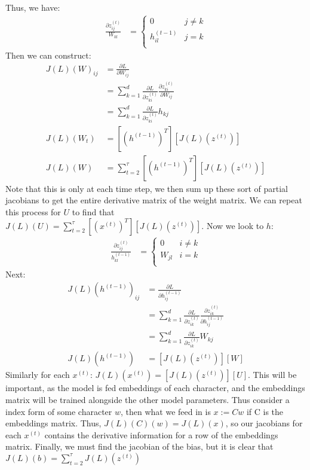 \documentclass[12pt]{article}
\begin{document}
Thus, we have:
\begin{align*}
    \frac{\partial z^{(t)}_{ij}}{W_{kl}} &= \begin{cases}
        0 & j \neq k \\
        h^{(t-1)}_{il} & j = k \\
    \end{cases}
\end{align*}
Then we can construct:
\begin{align*}
    J(L)(W)_{ij} &= \frac{\partial L}{\partial W_{ij}} \\
    &= \sum_{k = 1}^{d} \frac{\partial L}{\partial z^{(t)}_{ki}}\frac{\partial z^{(t)}_{ki}}{\partial W_{ij}} \\
    &= \sum_{k = 1}^{d} \frac{\partial L}{\partial z^{(t)}_{ki}}h_{kj} \\
    J(L)(W_t) &= [(h^{(t-1)})^T][J(L)(z^{(t)})] \\
    J(L)(W) &= \displaystyle \sum_{t = 2}^{\tau}[(h^{(t-1)})^T][J(L)(z^{(t)})]
\end{align*}
Note that this is only at each time step, we then sum up these sort of partial jacobians to get the entire derivative matrix of the weight matrix. We can repeat this process for $U$ to find that
$J(L)(U) = \displaystyle \sum_{t = 2}^{\tau}[(x^{(t)})^T][J(L)(z^{(t)})]$. Now we look to $h$:
\begin{align*}
    \frac{\partial z^{(t)}_{ij}}{h^{(t-1)}_{kl}} &= \begin{cases}
        0 & i \neq k \\
        W_{jl} & i = k \\
    \end{cases}
\end{align*}
Next:
\begin{align*}
    J(L)(h^{(t-1)})_{ij} &= \frac{\partial L}{\partial h^{(t-1)}_{ij}} \\
    &= \sum_{k = 1}^{d} \frac{\partial L}{\partial z^{(t)}_{ik}}\frac{\partial z^{(t)}_{ik}}{\partial h^{(t-1)}_{ij}} \\
    &= \sum_{k = 1}^{d} \frac{\partial L}{\partial z^{(t)}_{ik}}W_{kj} \\
    J(L)(h^{(t-1)}) &= [J(L)(z^{(t)})][W]
\end{align*}
Similarly for each $x^{(t)}$: $J(L)(x^{(t)}) = [J(L)(z^{(t)})][U]$. This will be important, as the model is fed embeddings of each character, and the embeddings
matrix will be trained alongside the other model parameters. Thus consider a index form of some character $w$, then what we feed in is $x := Cw$ if C is the embeddings
matrix. Thus, $J(L)(C)(w) = J(L)(x)$, so our jacobians for each $x^{(t)}$ contains the derivative information for a row of the embeddings matrix.
Finally, we must find the jacobian of the bias, but it is clear that $J(L)(b) = \displaystyle \sum_{t =2}^{\tau}J(L)(z^{(t)})$
\end{document}
